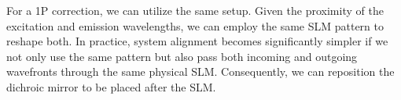 %

For a 1P correction, we can utilize the same setup. Given the proximity of the excitation and emission wavelengths, we can employ the same SLM pattern to reshape both. In practice, system alignment becomes significantly simpler if we not only use the same pattern but also pass both incoming and outgoing wavefronts through the same physical SLM. Consequently, we can reposition the dichroic mirror to be placed after the SLM.


